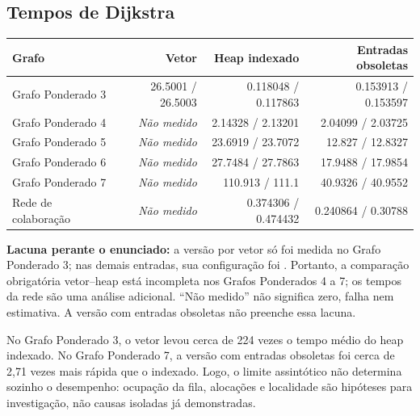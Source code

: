 \documentclass[a4paper,11pt]{article}
\newcommand{\cod}[1]{\texttt{\detokenize{#1}}}
\begin{document}
\subsection{Tempos de Dijkstra}
\par\smallskip\noindent\begin{minipage}{\textwidth}\centering
\begingroup\fontsize{9}{11}\selectfont
\setlength{\tabcolsep}{4pt}
\begin{tabular}{lrrr}
\toprule
Grafo & Vetor & Heap indexado & Entradas obsoletas \\
\midrule
Grafo Ponderado 3 & \num{26.5001} / \num{26.5003} & \num{0.118048} / \num{0.117863} & \num{0.153913} / \num{0.153597} \\
Grafo Ponderado 4 & \textit{Não medido} & \num{2.14328} / \num{2.13201} & \num{2.04099} / \num{2.03725} \\
Grafo Ponderado 5 & \textit{Não medido} & \num{23.6919} / \num{23.7072} & \num{12.827} / \num{12.8327} \\
Grafo Ponderado 6 & \textit{Não medido} & \num{27.7484} / \num{27.7863} & \num{17.9488} / \num{17.9854} \\
Grafo Ponderado 7 & \textit{Não medido} & \num{110.913} / \num{111.1} & \num{40.9326} / \num{40.9552} \\
Rede de colaboração & \textit{Não medido} & \num{0.374306} / \num{0.474432} & \num{0.240864} / \num{0.30788} \\
\bottomrule
\end{tabular}
\endgroup
{}
\end{minipage}\par\smallskip

\textbf{Lacuna perante o enunciado:} a versão por vetor só foi medida no Grafo Ponderado 3; nas demais entradas, sua configuração foi \cod{array=no}. Portanto, a comparação obrigatória vetor--heap está incompleta nos Grafos Ponderados 4 a 7; os tempos da rede são uma análise adicional. ``Não medido'' não significa zero, falha nem estimativa. A versão com entradas obsoletas não preenche essa lacuna.

No Grafo Ponderado 3, o vetor levou cerca de 224 vezes o tempo médio do heap indexado. No Grafo Ponderado 7, a versão com entradas obsoletas foi cerca de 2,71 vezes mais rápida que o indexado. Logo, o limite assintótico não determina sozinho o desempenho: ocupação da fila, alocações e localidade são hipóteses para investigação, não causas isoladas já demonstradas.
\newpage
\end{document}
